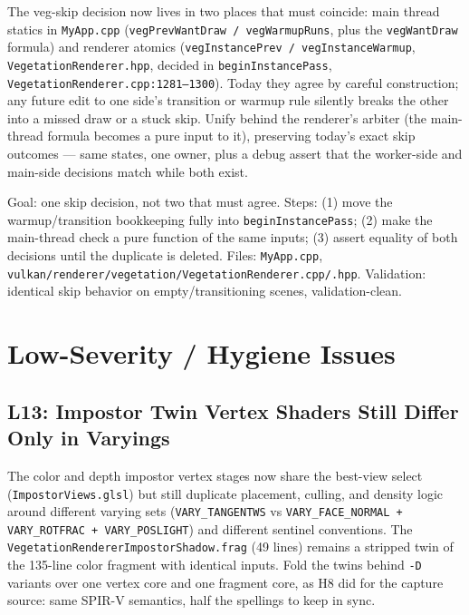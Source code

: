 \documentclass[11pt,a4paper]{article}
\begin{document}
The veg-skip decision now lives in two places that must coincide: main
thread statics in \texttt{MyApp.cpp} (\texttt{vegPrevWantDraw /
vegWarmupRuns}, plus the \texttt{vegWantDraw} formula) and renderer
atomics (\texttt{vegInstancePrev / vegInstanceWarmup},
\texttt{VegetationRenderer.hpp}, decided in
\texttt{beginInstancePass}, \texttt{VegetationRenderer.cpp:1281--1300}).
Today they agree by careful construction; any future edit to one side's
transition or warmup rule silently breaks the other into a missed draw or
a stuck skip. Unify behind the renderer's arbiter (the main-thread formula
becomes a pure input to it), preserving today's exact skip outcomes ---
same states, one owner, plus a debug assert that the worker-side and
main-side decisions match while both exist.

\begin{tcolorbox}[promptbox={Prompt --- M12: single veg-skip arbiter}]
Goal: one skip decision, not two that must agree. Steps: (1) move the
warmup/transition bookkeeping fully into \texttt{beginInstancePass};
(2) make the main-thread check a pure function of the same inputs;
(3) assert equality of both decisions until the duplicate is deleted.
Files: \texttt{MyApp.cpp},
\texttt{vulkan/renderer/vegetation/VegetationRenderer.cpp/.hpp}.
Validation: identical skip behavior on empty/transitioning scenes,
validation-clean.
\end{tcolorbox}

\section{Low-Severity / Hygiene Issues}

\subsection{L13: Impostor Twin Vertex Shaders Still Differ Only in Varyings}

The color and depth impostor vertex stages now share the best-view select
(\texttt{ImpostorViews.glsl}) but still duplicate placement, culling, and
density logic around different varying sets (\texttt{VARY\_TANGENTWS} vs
\texttt{VARY\_FACE\_NORMAL + VARY\_ROTFRAC + VARY\_POSLIGHT}) and different
sentinel conventions. The \texttt{VegetationRendererImpostorShadow.frag}
(49 lines) remains a stripped twin of the 135-line color fragment with
identical inputs. Fold the twins behind \texttt{-D} variants over one
vertex core and one fragment core, as H8 did for the capture source: same
SPIR-V semantics, half the spellings to keep in sync.
\end{document}
